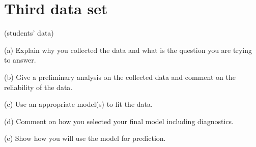 \section{Third data set}

(students’ data)

(a) Explain why you collected the data and what is the question you are trying to answer.

(b) Give a preliminary analysis on the collected data and comment on the reliability of the data.

(c) Use an appropriate model(s) to fit the data.

(d) Comment on how you selected your final model including diagnostics.

(e) Show how you will use the model for prediction.

